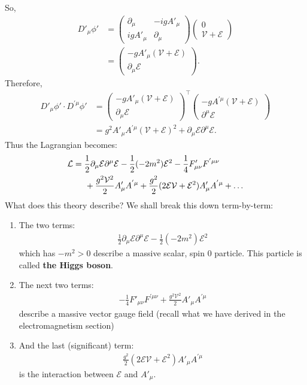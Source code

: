 \documentclass{book}
\numberwithin{equation}{section}
\theoremstyle{definition}
\newcommand{\p}{\partial}
\newcommand{\lag}{\mathcal{L}}
\newcommand{\E}{\mathcal{E}}
\begin{document}
So,
\begin{align}
D'_\mu \phi' &= \begin{pmatrix}
\p_\mu & -igA'_\mu\\
igA'_\mu &  \p_\mu
\end{pmatrix}\begin{pmatrix}
0 \\ \mathcal{V} + \mathcal{E} \end{pmatrix}\\ &= \begin{pmatrix}
-gA'_\mu (\mathcal{V} + \mathcal{E})\\
\p_\mu \mathcal{E}
\end{pmatrix}.
\end{align}
Therefore,
\begin{align}
D'_\mu \phi' \cdot D^{'\mu}\phi' &= \begin{pmatrix}
-gA'_\mu (\mathcal{V} + \mathcal{E})\\
\p_\mu \mathcal{E}
\end{pmatrix}^\top\begin{pmatrix}
-gA^{'\mu} (\mathcal{V} + \mathcal{E})\\
\p^\mu \mathcal{E}
\end{pmatrix}\\
 &= g^2 A'_\mu A^{'\mu}(\mathcal{V} + \mathcal{E})^2 + \p_\mu \mathcal{E} \p^\mu \mathcal{E}.
\end{align}
Thus the Lagrangian becomes:
\begin{align}
\lag &= \frac{1}{2}\p_\mu\E\p^\mu\E - \frac{1}{2}(-2m^2)\mathcal{E}^2 - \frac{1}{4}F'_{\mu\nu}F^{'\mu\nu}\\ 
&\hspace{0.5cm}+ \frac{g^2\mathcal{V}^2}{2}A'_\mu A^{'\mu} + \frac{g^2}{2}(2\mathcal{E}\mathcal{V} + \mathcal{E}^2)A'_\mu A^{'\mu} + \dots 
\end{align}
What does this theory describe? We shall break this down term-by-term:
\begin{enumerate}
	\item The two terms:
	\begin{align}
	\frac{1}{2}\p_\mu\E\p^\mu\E - \frac{1}{2}(-2m^2)\mathcal{E}^2
	\end{align}
	which has $-m^2 > 0$ describe a massive scalar, spin 0 particle. This particle is called \textbf{the Higgs boson}. \\
	
	\item The next two terms:
	\begin{align}
	- \frac{1}{4}F'_{\mu\nu}F^{'\mu\nu} + \frac{g^2\mathcal{V}^2}{2}A'_\mu A^{'\mu}
	\end{align}
	describe a massive vector gauge field (recall what we have derived in the electromagnetism section)\\
	
	\item And the last (significant) term:
	\begin{align}
	\frac{g^2}{2}(2\mathcal{E}\mathcal{V} + \mathcal{E}^2)A'_\mu A^{'\mu}
	\end{align}
	is the interaction between $\mathcal{E}$ and $A'_\mu$.
\end{enumerate}
\end{document}
